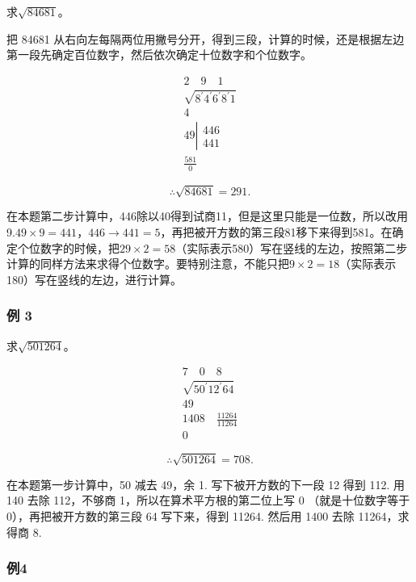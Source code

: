 求\(\sqrt{84681}\)。

 把 84681
从右向左每隔两位用撇号分开，得到三段，计算的时候，还是根据左边第一段先确定百位数字，然后依次确定十位数字和个位数字。

\[
\begin{array}{r} 2 \quad 9 \quad 1 \\ \sqrt {8 ^ {\prime} 4 ^ {\prime} 6 ^ {\prime} 8 ^ {\prime} 1} \\ 4 \\ 49 \left| \begin{array}{l} 446 \\ 441 \end{array} \right. \\ \frac{581}{0} \end{array}
\]

\[
\therefore \sqrt {84681} = 291.
\]

在本题第二步计算中，446除以40得到试商11，但是这里只能是一位数，所以改用9.\(49 \times 9 = 441\)，\(446 \rightarrow 441 = 5\)，再把被开方数的第三段81移下来得到581。在确定个位数字的时候，把\(29 \times 2 = 58\)（实际表示580）写在竖线的左边，按照第二步计算的同样方法来求得个位数字。要特别注意，不能只把\(9 \times 2 = 18\)（实际表示180）写在竖线的左边，进行计算。

\subsubsection{例 3}

求\(\sqrt{501264}\)。


\[
\begin{array}{r} 7 \quad 0 \quad 8 \\ \sqrt {50 ^ {\prime} 12 ^ {\prime} 64} \\ 49 \\ \hline 1408 \quad \frac{11264}{11264} \\ \hline 0 \end{array}
\]

\[
\therefore \sqrt {501264} = 708.
\]

 在本题第一步计算中，50 减去 49，余 1.
写下被开方数的下一段 12 得到 112. 用 140 去除 112，不够商
1，所以在算术平方根的第二位上写 0 （就是十位数字等于
0），再把被开方数的第三段 64 写下来，得到 11264. 然后用 1400 去除
11264，求得商 8.

\subsubsection{例4}

